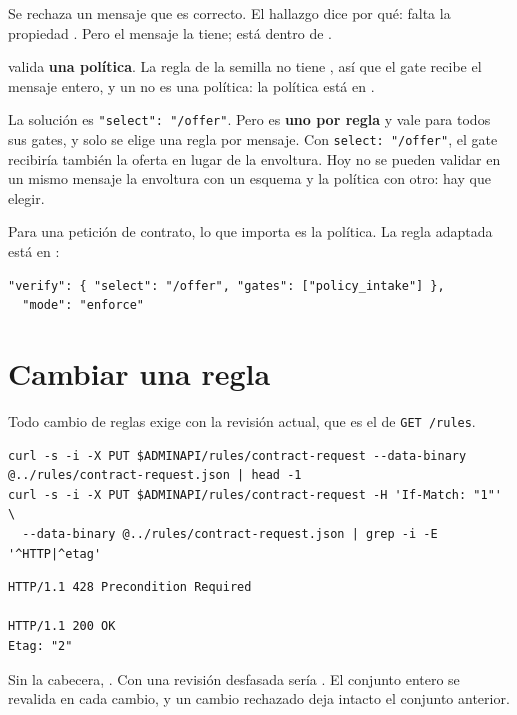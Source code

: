 Se rechaza un mensaje que es correcto. El hallazgo dice por qué: falta la propiedad . Pero el
mensaje la tiene; está dentro de .

\begin{trampaHabitual}
 valida \textbf{una política}. La regla de la semilla no tiene , así que el
gate  recibe el mensaje entero, y un  no es una política: la
política está en .

La solución es \texttt{"select": "/\allowbreak{}offer"}. Pero  es \textbf{uno por regla} y vale para todos sus
gates, y solo se elige una regla por mensaje. Con \texttt{select: "/\allowbreak{}offer"}, el gate  recibiría
también la oferta en lugar de la envoltura. Hoy no se pueden validar en un mismo mensaje la envoltura con un
esquema y la política con otro: hay que elegir.
\end{trampaHabitual}

Para una petición de contrato, lo que importa es la política. La regla adaptada está en
:

\begin{lstlisting}[style=json]
  "verify": { "select": "/offer", "gates": ["policy_intake"] },
  "mode": "enforce"
\end{lstlisting}

\section{Cambiar una regla}

Todo cambio de reglas exige  con la revisión actual, que es el  de \texttt{GET /\allowbreak{}rules}.

\begin{lstlisting}[style=sh]
curl -s -i -X PUT $ADMINAPI/rules/contract-request --data-binary @../rules/contract-request.json | head -1
curl -s -i -X PUT $ADMINAPI/rules/contract-request -H 'If-Match: "1"' \
  --data-binary @../rules/contract-request.json | grep -i -E '^HTTP|^etag'
\end{lstlisting}
\begin{lstlisting}[style=out]
HTTP/1.1 428 Precondition Required

HTTP/1.1 200 OK
Etag: "2"
\end{lstlisting}

Sin la cabecera, . Con una revisión desfasada sería . El conjunto entero se revalida en cada
cambio, y un cambio rechazado deja intacto el conjunto anterior.

